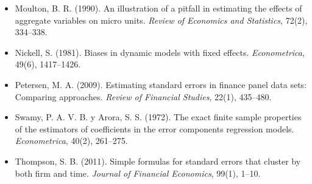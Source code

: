 \begin{itemize}[leftmargin=*]
  \item Moulton, B. R. (1990). An illustration of a pitfall in estimating the effects of aggregate variables on micro units.
        \emph{Review of Economics and Statistics}, 72(2), 334--338.
  \item Nickell, S. (1981). Biases in dynamic models with fixed effects. \emph{Econometrica}, 49(6), 1417--1426.
  \item Petersen, M. A. (2009). Estimating standard errors in finance panel data sets: Comparing approaches. \emph{Review of
        Financial Studies}, 22(1), 435--480.
  \item Swamy, P. A. V. B. y Arora, S. S. (1972). The exact finite sample properties of the estimators of coefficients in the error
        components regression models. \emph{Econometrica}, 40(2), 261--275.
  \item Thompson, S. B. (2011). Simple formulas for standard errors that cluster by both firm and time. \emph{Journal of Financial
        Economics}, 99(1), 1--10.
\end{itemize}
